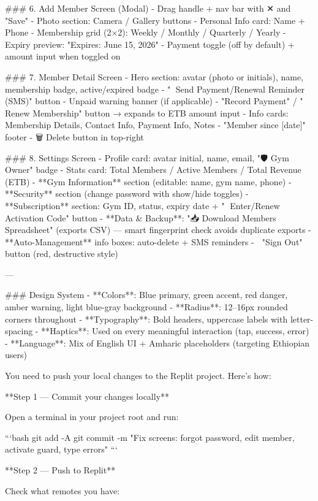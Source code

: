 ### 6. Add Member Screen (Modal)
- Drag handle + nav bar with ✕ and "Save"
- Photo section: Camera / Gallery buttons
- Personal Info card: Name + Phone
- Membership grid (2×2): Weekly / Monthly / Quarterly / Yearly
- Expiry preview: "Expires: June 15, 2026"
- Payment toggle (off by default) + amount input when toggled on

### 7. Member Detail Screen
- Hero section: avatar (photo or initials), name, membership badge, active/expired badge
- "📩 Send Payment/Renewal Reminder (SMS)" button
- Unpaid warning banner (if applicable)
- "Record Payment" / "🔄 Renew Membership" button → expands to ETB amount input
- Info cards: Membership Details, Contact Info, Payment Info, Notes
- "Member since [date]" footer
- 🗑 Delete button in top-right

### 8. Settings Screen
- Profile card: avatar initial, name, email, "🛡 Gym Owner" badge
- Stats card: Total Members / Active Members / Total Revenue (ETB)
- **Gym Information** section (editable: name, gym name, phone)
- **Security** section (change password with show/hide toggles)
- **Subscription** section: Gym ID, status, expiry date + "🔑 Enter/Renew Activation Code" button
- **Data & Backup**: "📥 Download Members Spreadsheet" (exports CSV) — smart fingerprint check avoids duplicate exports
- **Auto-Management** info boxes: auto-delete + SMS reminders
- 🚪 "Sign Out" button (red, destructive style)

---

### Design System
- **Colors**: Blue primary, green accent, red danger, amber warning, light blue-gray background
- **Radius**: 12–16px rounded corners throughout
- **Typography**: Bold headers, uppercase labels with letter-spacing
- **Haptics**: Used on every meaningful interaction (tap, success, error)
- **Language**: Mix of English UI + Amharic placeholders (targeting Ethiopian users)





You need to push your local changes to the Replit project. Here's how:

**Step 1 — Commit your changes locally**

Open a terminal in your project root and run:

```bash
git add -A
git commit -m "Fix screens: forgot password, edit member, activate guard, type errors"
```

**Step 2 — Push to Replit**

Check what remotes you have:

